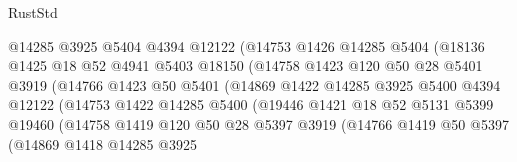 \begin{lexlean}{RustStd}
\begin{coremodule}
                            @14285
                            @3925
                            @5404
                            @4394
                            @12122
                            (@14753
                              @1426
                              @14285
                              @5404
                              (@18136
                                @1425
                                @18
                                @52
                                @4941
                                @5403
                                @18150
                                (@14758
                                  @1423
                                  @120
                                  @50
                                  @28
                                  @5401
                                  @3919
                                  (@14766
                                    @1423
                                    @50
                                    @5401
                                    (@14869
                                      @1422
                                      @14285
                                      @3925
                                      @5400
                                      @4394
                                      @12122
                                      (@14753
                                        @1422
                                        @14285
                                        @5400
                                        (@19446
                                          @1421
                                          @18
                                          @52
                                          @5131
                                          @5399
                                          @19460
                                          (@14758
                                            @1419
                                            @120
                                            @50
                                            @28
                                            @5397
                                            @3919
                                            (@14766
                                              @1419
                                              @50
                                              @5397
                                              (@14869
                                                @1418
                                                @14285
                                                @3925

\end{coremodule}
\end{lexlean}
